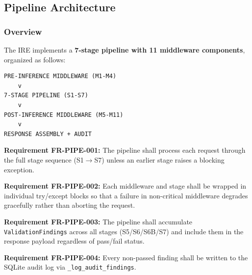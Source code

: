 ﻿\documentclass[10pt,journal,onecolumn]{IEEEtran}
\newcommand{\reqid}[1]{\textbf{#1}}
\begin{document}
\subsection{Pipeline Architecture}

\subsubsection{Overview}
The IRE implements a \textbf{7-stage pipeline with 11 middleware components}, organized as follows:
\begin{lstlisting}
PRE-INFERENCE MIDDLEWARE (M1-M4)
    v
7-STAGE PIPELINE (S1-S7)
    v
POST-INFERENCE MIDDLEWARE (M5-M11)
    v
RESPONSE ASSEMBLY + AUDIT
\end{lstlisting}

\reqid{Requirement FR-PIPE-001:} The pipeline shall process each request through the full stage sequence (S1$\rightarrow$S7) unless an earlier stage raises a blocking exception.

\reqid{Requirement FR-PIPE-002:} Each middleware and stage shall be wrapped in individual try/except blocks so that a failure in non-critical middleware degrades gracefully rather than aborting the request.

\reqid{Requirement FR-PIPE-003:} The pipeline shall accumulate \texttt{ValidationFindings} across all stages (S5/S6/S6B/S7) and include them in the response payload regardless of pass/fail status.

\reqid{Requirement FR-PIPE-004:} Every non-passed finding shall be written to the SQLite audit log via \texttt{\_log\_audit\_findings}.
\end{document}
